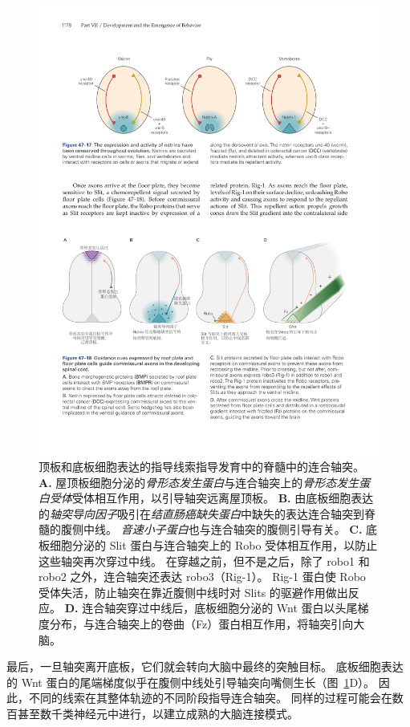 \begin{figure}[htbp]
	\centering
	\includegraphics[width=1.0\linewidth]{chap47/fig_47_18}
	\caption{顶板和底板细胞表达的指导线索指导发育中的脊髓中的连合轴突。
		\textbf{A.} 屋顶板细胞分泌的\textit{骨形态发生蛋白}与连合轴突上的\textit{骨形态发生蛋白受体}受体相互作用，以引导轴突远离屋顶板。
		\textbf{B.} 由底板细胞表达的\textit{轴突导向因子}吸引在\textit{结直肠癌缺失蛋白}中缺失的表达连合轴突到脊髓的腹侧中线。
		\textit{音速小子蛋白}也与连合轴突的腹侧引导有关。
		\textbf{C.} 底板细胞分泌的 Slit 蛋白与连合轴突上的 Robo 受体相互作用，以防止这些轴突再次穿过中线。
		在穿越之前，但不是之后，除了 robo1 和 robo2 之外，连合轴突还表达 robo3（Rig-1）。
		Rig-1 蛋白使 Robo 受体失活，防止轴突在靠近腹侧中线时对 Slits 的驱避作用做出反应。
		\textbf{D.} 连合轴突穿过中线后，底板细胞分泌的 Wnt 蛋白以头尾梯度分布，与连合轴突上的卷曲（Fz）蛋白相互作用，将轴突引向大脑。}
	\label{fig:47_18}
\end{figure}


最后，一旦轴突离开底板，它们就会转向大脑中最终的突触目标。
底板细胞表达的 Wnt 蛋白的尾端梯度似乎在腹侧中线处引导轴突向嘴侧生长（图~\ref{fig:47_18}D）。
因此，不同的线索在其整体轨迹的不同阶段指导连合轴突。
同样的过程可能会在数百甚至数千类神经元中进行，以建立成熟的大脑连接模式。



